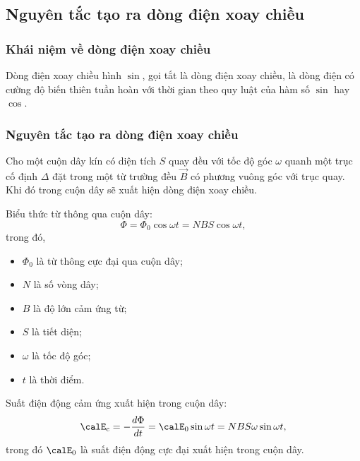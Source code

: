 \subsection{Nguyên tắc tạo ra dòng điện xoay chiều}
\subsubsection{Khái niệm về dòng điện xoay chiều}
Dòng điện xoay chiều hình $\sin$, gọi tắt là dòng điện xoay chiều, là dòng điện có cường độ biến thiên tuần hoàn với thời gian theo quy luật của hàm số $\sin$ hay $\cos$.
\subsubsection{Nguyên tắc tạo ra dòng điện xoay chiều}
Cho một cuộn dây kín có diện tích $S$ quay đều với tốc độ góc $\omega$ quanh một trục cố định $\Delta$ đặt trong một từ trường đều $\vec B$ có phương vuông góc với trục quay. Khi đó trong cuộn dây sẽ xuất hiện dòng điện xoay chiều.

Biểu thức từ thông qua cuộn dây:
\begin{equation*}
	\Phi =\Phi_0 \cos \omega t= NBS \cos \omega t,
\end{equation*}
trong đó,
\begin{itemize}
	\item $\Phi_0$ là từ thông cực đại qua cuộn dây;
	\item $N$ là số vòng dây;
	\item $B$ là độ lớn cảm ứng từ;
	\item $S$ là tiết diện;
	\item $\omega$ là tốc độ góc;
	\item $t$ là thời điểm.
\end{itemize}
Suất điện động cảm ứng xuất hiện trong cuộn dây:
\begin{equation*}
	\calE_\text c=-\dfrac{d \Phi}{d t} = \calE_0 \sin \omega t =NBS\omega \sin \omega t,
\end{equation*}
trong đó $\calE_0$ là suất điện động cực đại xuất hiện trong cuộn dây.

